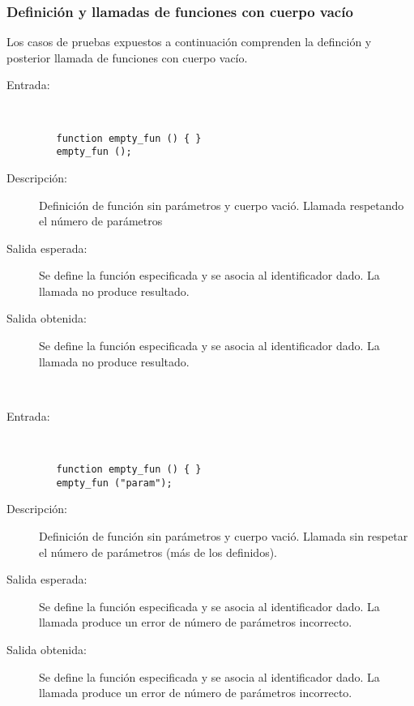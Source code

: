 \subsubsection{Definición y llamadas de funciones con cuerpo vacío}

Los casos de pruebas expuestos a continuación comprenden la definción y posterior llamada de funciones con cuerpo vacío.

	\begin{description}
		\item [Entrada:] \hfill \\
\begin{lstlisting}
   function empty_fun () { } 
   empty_fun ();
\end{lstlisting}
		\item [Descripción:] Definición de función sin parámetros y cuerpo vació. Llamada respetando el número de parámetros
		\item [Salida esperada:] Se define la función especificada y se asocia al identificador dado. La llamada no produce resultado.
		\item [Salida obtenida:] Se define la función especificada y se asocia al identificador dado. La llamada no produce resultado.
	\end{description}
\hfil \\
	\begin{description}
		\item [Entrada:] \hfill \\
\begin{lstlisting}
   function empty_fun () { } 
   empty_fun ("param");
\end{lstlisting}
		\item [Descripción:] Definición de función sin parámetros y cuerpo vació. Llamada sin respetar el número de parámetros (más de los definidos). 
		\item [Salida esperada:] Se define la función especificada y se asocia al identificador dado. La llamada produce un error de número de parámetros incorrecto.
		\item [Salida obtenida:] Se define la función especificada y se asocia al identificador dado. La llamada produce un error de número de parámetros incorrecto.
	\end{description}
\hfil \\

